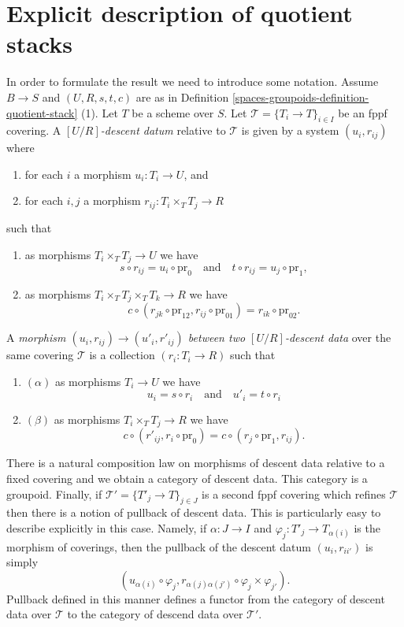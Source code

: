 \section{Explicit description of quotient stacks}
\label{spaces-groupoids-section-explicit-quotient-stacks}
In order to formulate the result we need to introduce some
notation. Assume $B \to S$ and $(U, R, s, t, c)$ are as in
Definition \ref{spaces-groupoids-definition-quotient-stack} (1).
Let $T$ be a scheme over $S$. Let $\mathcal{T} = \{T_i \to T\}_{i \in I}$
be an fppf covering. A {\it $[U/R]$-descent datum} relative
to $\mathcal{T}$ is given by a system $(u_i, r_{ij})$ where
\begin{enumerate}
\item for each $i$ a morphism $u_i : T_i \to U$, and
\item for each $i, j$ a morphism $r_{ij} : T_i \times_T T_j \to R$
\end{enumerate}
such that
\begin{enumerate}
\item[(a)] as morphisms $T_i \times_T T_j \to U$ we have
$$
s \circ r_{ij} = u_i \circ \text{pr}_0
\quad\text{and}\quad
t \circ r_{ij} = u_j \circ \text{pr}_1,
$$
\item[(b)] as morphisms $T_i \times_T T_j \times_T T_k \to R$ we have
$$
c \circ (r_{jk} \circ \text{pr}_{12}, r_{ij} \circ \text{pr}_{01})
= r_{ik} \circ \text{pr}_{02}.
$$
\end{enumerate}
A {\it morphism $(u_i, r_{ij}) \to (u'_i, r'_{ij})$ between two
$[U/R]$-descent data} over the same covering $\mathcal{T}$
is a collection $(r_i : T_i \to R)$ such that
\begin{enumerate}
\item[] $(\alpha)$ as morphisms $T_i \to U$ we have
$$
u_i = s \circ r_i
\quad\text{and}\quad
u'_i = t \circ r_i
$$
\item[] $(\beta)$ as morphisms $T_i \times_T T_j \to R$ we have
$$
c \circ (r'_{ij}, r_i \circ \text{pr}_0)
=
c \circ (r_j \circ \text{pr}_1, r_{ij}).
$$
\end{enumerate}
There is a natural composition law on morphisms of descent data relative
to a fixed covering and we obtain a category of descent data.
This category is a groupoid. Finally, if
$\mathcal{T}' = \{T'_j \to T\}_{j \in J}$
is a second fppf covering which refines $\mathcal{T}$ then there
is a notion of pullback of descent data. This is particularly easy to
describe explicitly in this case. Namely, if $\alpha : J \to I$ and
$\varphi_j : T'_j \to T_{\alpha(i)}$ is the morphism of coverings, then
the pullback of the descent datum $(u_i, r_{ii'})$ is simply
$$
(u_{\alpha(i)} \circ \varphi_j,
r_{\alpha(j)\alpha(j')} \circ \varphi_j \times \varphi_{j'}).
$$
Pullback defined in this manner defines a functor from the category of
descent data over $\mathcal{T}$ to the category of descend data over
$\mathcal{T}'$.

